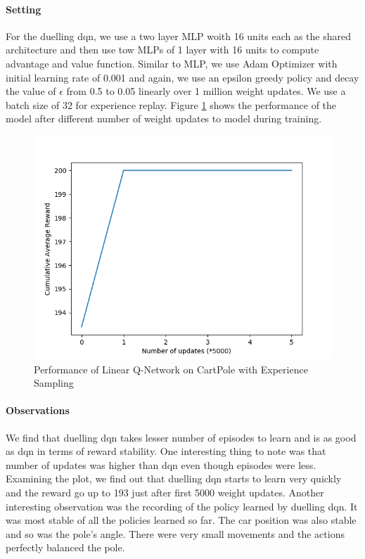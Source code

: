 \documentclass[12pt]{article}
\begin{document}
\paragraph{Setting} For the duelling dqn, we use a two layer MLP woith 16 units each as the shared architecture and then use tow MLPs of 1 layer with 16 units to compute advantage and value function. Similar to MLP, we use Adam Optimizer with initial learning rate of 0.001 and again, we use an epsilon greedy policy and decay the value of $\epsilon$ from 0.5 to 0.05 linearly over 1 million weight updates. We use a batch size of 32 for experience replay. Figure \ref{fig:05} shows the performance of the model after different number of weight updates to model during training.
\begin{figure}[h]
  \centering
  \vspace{-5mm}
  \includegraphics[width=0.8\linewidth]{figures/reward_plot_05.png}
  \caption{Performance of Linear Q-Network on CartPole with Experience Sampling}
  \label{fig:05}
\end{figure}
\paragraph{Observations} We find that duelling dqn takes lesser number of episodes to learn and is as good as dqn in terms of reward stability. One interesting thing to note was that number of updates was higher than dqn even though episodes were less. Examining the plot, we find out that duelling dqn starts to learn very quickly and the reward go up to 193 just after first 5000 weight updates. Another interesting observation was the recording of the policy learned by duelling dqn. It was most stable of all the policies learned so far. The car position was also stable and so was the pole's angle. There were very small movements and the actions perfectly balanced the pole. 
\end{document}
